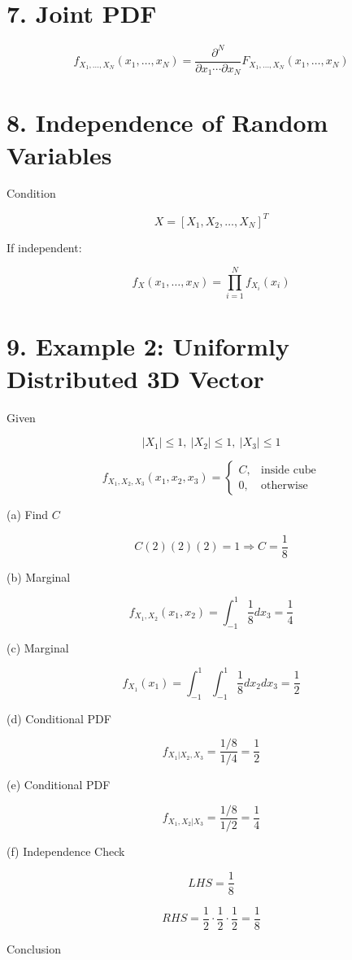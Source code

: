\documentclass[12pt]{article}
\begin{document}
\section*{7. Joint PDF}

\[
f_{X_1,\dots,X_N}(x_1,\dots,x_N)=
\frac{\partial^N}{\partial x_1\cdots \partial x_N}
F_{X_1,\dots,X_N}(x_1,\dots,x_N)
\]

\section*{8. Independence of Random Variables}

Condition

\[
X=[X_1,X_2,\dots,X_N]^T
\]

If independent:

\[
f_X(x_1,\dots,x_N)=\prod_{i=1}^N f_{X_i}(x_i)
\]

\section*{9. Example 2: Uniformly Distributed 3D Vector}

Given

\[
|X_1|\le1,\ |X_2|\le1,\ |X_3|\le1
\]

\[
f_{X_1,X_2,X_3}(x_1,x_2,x_3)=
\begin{cases}
C, & \text{inside cube} \\
0, & \text{otherwise}
\end{cases}
\]

(a) Find $C$

\[
C(2)(2)(2)=1 \Rightarrow C=\frac{1}{8}
\]

(b) Marginal

\[
f_{X_1,X_2}(x_1,x_2)=\int_{-1}^{1}\frac{1}{8}dx_3=\frac{1}{4}
\]

(c) Marginal

\[
f_{X_1}(x_1)=\int_{-1}^{1}\int_{-1}^{1}\frac{1}{8}dx_2dx_3=\frac{1}{2}
\]

(d) Conditional PDF

\[
f_{X_1|X_2,X_3}=\frac{1/8}{1/4}=\frac{1}{2}
\]

(e) Conditional PDF

\[
f_{X_1,X_2|X_3}=\frac{1/8}{1/2}=\frac{1}{4}
\]

(f) Independence Check

\[
LHS=\frac{1}{8}
\]

\[
RHS=\frac{1}{2}\cdot\frac{1}{2}\cdot\frac{1}{2}=\frac{1}{8}
\]

Conclusion
\end{document}
